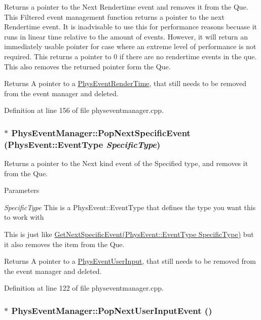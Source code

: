 Returns a pointer to the Next Rendertime event and removes it from the Que. This Filtered event management function returns a pointer to the next Rendertime event. It is inadvisable to use this for performance reasons becuase it runs in linear time relative to the amount of events. However, it will return an immediately usable pointer for case where an extreme level of performance is not required. This returns a pointer to 0 if there are no rendertime events in the que. This also removes the returned pointer form the Que. \begin{DoxyReturn}{Returns}
A pointer to a \hyperlink{classPhysEventRenderTime}{PhysEventRenderTime}, that still needs to be removed from the event manager and deleted. 
\end{DoxyReturn}


Definition at line 156 of file physeventmanager.cpp.\hypertarget{classPhysEventManager_abce156f7ad7ab145b8b05740b48e6073}{
\subsubsection[{PopNextSpecificEvent}]{ $\ast$ PhysEventManager::PopNextSpecificEvent (PhysEvent::EventType {\em SpecificType})}}
\label{d5/dd7/classPhysEventManager_abce156f7ad7ab145b8b05740b48e6073}


Returns a pointer to the Next kind event of the Specified type, and removes it from the Que. 
\begin{DoxyParams}{Parameters}
\item[{\em SpecificType}]This is a PhysEvent::EventType that defines the type you want this to work with\end{DoxyParams}
This is just like \hyperlink{classPhysEventManager_a56e45572c2fb84131f7d55c060c7ac21}{GetNextSpecificEvent(PhysEvent::EventType SpecificType)} but it also removes the item from the Que. \begin{DoxyReturn}{Returns}
A pointer to a \hyperlink{classPhysEventUserInput}{PhysEventUserInput}, that still needs to be removed from the event manager and deleted. 
\end{DoxyReturn}


Definition at line 122 of file physeventmanager.cpp.\hypertarget{classPhysEventManager_ad6612a6e1c728941e2c467e7f136ca51}{
\subsubsection[{PopNextUserInputEvent}]{ $\ast$ PhysEventManager::PopNextUserInputEvent ()}}
\label{d5/dd7/classPhysEventManager_ad6612a6e1c728941e2c467e7f136ca51}



